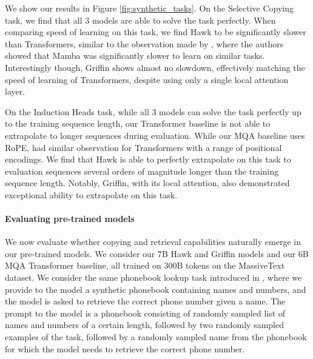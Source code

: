 \documentclass[11pt, a4paper, logo, onecolumn]{googledeepmind}
\theoremstyle{definition}
\begin{document}
We show our results in Figure \ref{fig:synthetic_tasks}. 
On the Selective Copying task, we find that all 3 models are able to solve the task perfectly. 
When comparing speed of learning on this task, we find Hawk to be significantly slower than Transformers, similar to the observation made by \citet{jelassi2024repeat}, where the authors showed that Mamba was significantly slower to learn on similar tasks. 
Interestingly though, Griffin shows almost no slowdown, effectively matching the speed of learning of Transformers, despite using only a single local attention layer.

On the Induction Heads task, while all 3 models can solve the task perfectly up to the training sequence length, our Transformer baseline is not able to extrapolate to longer sequences during evaluation. 
While our MQA baseline uses RoPE, \citet{gu2023mamba} had similar observation for Transformers with a range of positional encodings. 
We find that Hawk is able to perfectly extrapolate on this task to evaluation sequences several orders of magnitude longer than the training sequence length. 
Notably, Griffin, with its local attention, also demonstrated exceptional ability to extrapolate on this task.

\paragraph{Evaluating pre-trained models} 

We now evaluate whether copying and retrieval capabilities naturally emerge in our pre-trained models. We consider our 7B Hawk and Griffin models and our 6B MQA Transformer baseline, all trained on 300B tokens on the MassiveText dataset. 
We consider the same phonebook lookup task introduced in \citet{jelassi2024repeat}, where we provide to the model a synthetic phonebook containing names and numbers, and the model is asked to retrieve the correct phone number given a name. 
The prompt to the model is a phonebook consisting of randomly sampled list of names and numbers of a certain length, followed by two randomly sampled examples of the task, followed by a randomly sampled name from the phonebook for which the model needs to retrieve the correct phone number.
\end{document}
